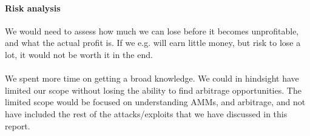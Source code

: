 \paragraph{Risk analysis} We would need to assess how much we can lose before it
becomes unprofitable, and what the actual profit is. If we e.g. will earn little
money, but risk to lose a lot, it would not be worth it in the end.\\\\
We spent more time on getting a broad knowledge. We could in hindsight
have limited our scope without losing the ability to find arbitrage
opportunities. The limited scope would be focused on understanding AMMs, and
arbitrage, and not have included the rest of the attacks/exploits that we have
discussed in this report.
